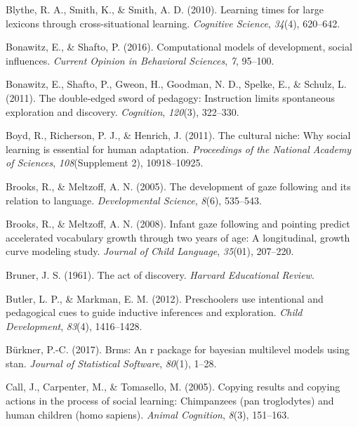 \documentclass[oneside]{report}
\begin{document}
\hypertarget{ref-blythe2010learning}{}
Blythe, R. A., Smith, K., \& Smith, A. D. (2010). Learning times for
large lexicons through cross-situational learning. \emph{Cognitive
Science}, \emph{34}(4), 620--642.

\hypertarget{ref-bonawitz2016computational}{}
Bonawitz, E., \& Shafto, P. (2016). Computational models of development,
social influences. \emph{Current Opinion in Behavioral Sciences},
\emph{7}, 95--100.

\hypertarget{ref-bonawitz2011double}{}
Bonawitz, E., Shafto, P., Gweon, H., Goodman, N. D., Spelke, E., \&
Schulz, L. (2011). The double-edged sword of pedagogy: Instruction
limits spontaneous exploration and discovery. \emph{Cognition},
\emph{120}(3), 322--330.

\hypertarget{ref-boyd2011cultural}{}
Boyd, R., Richerson, P. J., \& Henrich, J. (2011). The cultural niche:
Why social learning is essential for human adaptation. \emph{Proceedings
of the National Academy of Sciences}, \emph{108}(Supplement 2),
10918--10925.

\hypertarget{ref-brooks2005development}{}
Brooks, R., \& Meltzoff, A. N. (2005). The development of gaze following
and its relation to language. \emph{Developmental Science}, \emph{8}(6),
535--543.

\hypertarget{ref-brooks2008infant}{}
Brooks, R., \& Meltzoff, A. N. (2008). Infant gaze following and
pointing predict accelerated vocabulary growth through two years of age:
A longitudinal, growth curve modeling study. \emph{Journal of Child
Language}, \emph{35}(01), 207--220.

\hypertarget{ref-bruner1961act}{}
Bruner, J. S. (1961). The act of discovery. \emph{Harvard Educational
Review}.

\hypertarget{ref-butler2012preschoolers}{}
Butler, L. P., \& Markman, E. M. (2012). Preschoolers use intentional
and pedagogical cues to guide inductive inferences and exploration.
\emph{Child Development}, \emph{83}(4), 1416--1428.

\hypertarget{ref-burkner2017brms}{}
Bürkner, P.-C. (2017). Brms: An r package for bayesian multilevel models
using stan. \emph{Journal of Statistical Software}, \emph{80}(1), 1--28.

\hypertarget{ref-call2005copying}{}
Call, J., Carpenter, M., \& Tomasello, M. (2005). Copying results and
copying actions in the process of social learning: Chimpanzees (pan
troglodytes) and human children (homo sapiens). \emph{Animal Cognition},
\emph{8}(3), 151--163.
\end{document}
